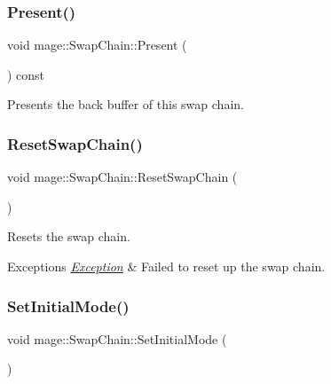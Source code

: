 \subsubsection{\texorpdfstring{Present()}{Present()}}
{\footnotesize\ttfamily void mage\+::\+Swap\+Chain\+::\+Present (\begin{DoxyParamCaption}{ }\end{DoxyParamCaption}) const\hspace{0.3cm}{\ttfamily [noexcept]}}

Presents the back buffer of this swap chain. \hypertarget{classmage_1_1_swap_chain_a30b25245e86823e1b08a39887de8d918}{}\label{classmage_1_1_swap_chain_a30b25245e86823e1b08a39887de8d918} 
\subsubsection{\texorpdfstring{Reset\+Swap\+Chain()}{ResetSwapChain()}}
{\footnotesize\ttfamily void mage\+::\+Swap\+Chain\+::\+Reset\+Swap\+Chain (\begin{DoxyParamCaption}{ }\end{DoxyParamCaption})\hspace{0.3cm}{\ttfamily [private]}}

Resets the swap chain.


\begin{DoxyExceptions}{Exceptions}
{\em \hyperlink{classmage_1_1_exception}{Exception}} & Failed to reset up the swap chain. \\
\hline
\end{DoxyExceptions}
\hypertarget{classmage_1_1_swap_chain_a662009705a6e23064351fd0d9b77ef0e}{}\label{classmage_1_1_swap_chain_a662009705a6e23064351fd0d9b77ef0e} 
\subsubsection{\texorpdfstring{Set\+Initial\+Mode()}{SetInitialMode()}}
{\footnotesize\ttfamily void mage\+::\+Swap\+Chain\+::\+Set\+Initial\+Mode (\begin{DoxyParamCaption}{ }\end{DoxyParamCaption})}

